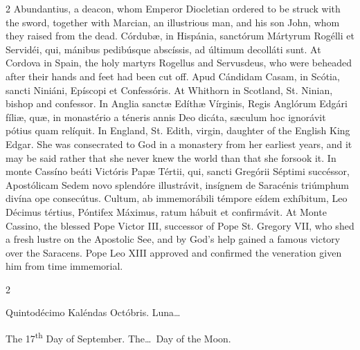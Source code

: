 \begin{paracol}{2}
 Abundantius, a deacon, whom Emperor Diocletian ordered to be struck with the 
 sword, together with Marcian, an illustrious man, and his son John, whom 
 they raised from the dead.
\switchcolumn*
{}
Córdubæ, in Hispánia, 
 sanctórum Mártyrum Rogélli et Servidéi, qui, mánibus pedibúsque abscíssis, 
 ad últimum decolláti sunt.
\switchcolumn
{}
At Cordova in Spain, the holy 
 martyrs Rogellus and Servusdeus, who were beheaded after their hands and 
 feet had been cut off.
\switchcolumn*
{}
Apud Cándidam Casam, in 
 Scótia, sancti Niniáni, Epíscopi et Confessóris.
\switchcolumn
{}
At Whithorn in Scotland, St. Ninian, 
 bishop and confessor.
\switchcolumn*
{}
In Anglia sanctæ Edíthæ 
 Vírginis, Regis Anglórum Edgári fíliæ, quæ, in monastério a téneris annis 
 Deo dicáta, sæculum hoc ignorávit pótius quam relíquit.
\switchcolumn
{}
In England, St. Edith, virgin, 
 daughter of the English King Edgar. She was consecrated to God in a 
 monastery from her earliest years, and it may be said rather that she never 
 knew the world than that she forsook it.
\switchcolumn*
{}
In monte Cassíno beáti 
 Victóris Papæ Tértii, qui, sancti Gregórii Séptimi succéssor, Apostólicam 
 Sedem novo splendóre illustrávit, insígnem de Saracénis triúmphum divína ope 
 consecútus. Cultum, ab immemorábili témpore eídem exhíbitum, Leo 
 Décimus tértius, Póntifex Máximus, ratum hábuit et confirmávit.
\switchcolumn
{}
At Monte Cassino, the blessed Pope 
 Victor III, successor of Pope St. Gregory VII, who shed a fresh lustre on 
 the Apostolic See, and by God's help gained a famous victory over the 
 Saracens. Pope Leo XIII approved and confirmed the veneration given 
 him from time immemorial.
\switchcolumn*
{}
\end{paracol}


\begin{paracol}{2}
\begin{center}{\color{gregoriocolor} Quintodécimo Kaléndas Octóbris. 
 Luna\dots\ }\end{center}
\switchcolumn
{}
\begin{center}{\color{gregoriocolor} The   17\textsuperscript{th} Day of 
 September. The\dots\ Day of the Moon.}\end{center}
\end{paracol}

